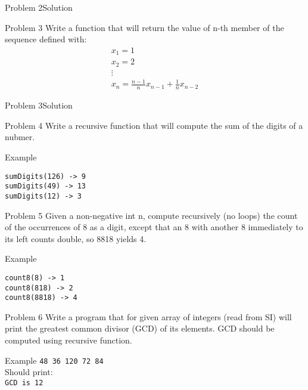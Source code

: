 \begin{frame}[fragile]{Problem 2}{Solution} 

\end{frame}

\begin{frame}{Problem 3}
Write a function that will return the value of n-th member of the sequence
defined with:
\[
   \begin{array}{l}
   x_1 = 1\\
   x_2 = 2\\ 
   \vdots\\
   x_n = \frac{n - 1}{n}x_{n - 1} + \frac{1}{n}x_{n - 2}
   \end{array}
\]
\end{frame}


\begin{frame}[fragile]{Problem 3}{Solution}

\end{frame}


\begin{frame}[fragile]{Problem 4}
Write a recursive function that will compute the sum of the digits of a nubmer.
\begin{exampleblock}{Example}
\begin{verbatim}
sumDigits(126) -> 9
sumDigits(49) -> 13
sumDigits(12) -> 3
\end{verbatim}
\end{exampleblock}
\pause

\end{frame}

\begin{frame}[fragile]{Problem 5}
Given a non-negative int n, compute recursively (no loops) the count of the
occurrences of 8 as a digit, except that an 8 with another 8 immediately to its
left counts double, so 8818 yields 4.
\begin{exampleblock}{Example}
\begin{verbatim}
count8(8) -> 1
count8(818) -> 2
count8(8818) -> 4
\end{verbatim}
\end{exampleblock}
\pause

\end{frame}


\begin{frame}{Problem 6}
Write a program that for given array of integers (read from SI) will print the
greatest common divisor (GCD) of its elements. GCD should be computed using
recursive function.
\begin{exampleblock}{Example}
\texttt{48 36 120 72 84}\\
Should print:\\
\texttt{GCD is 12}
\end{exampleblock}
\end{frame}

